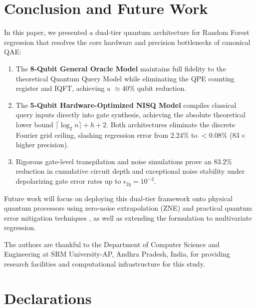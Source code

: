 \documentclass[sn-mathphys,Numbered]{sn-jnl}
\theoremstyle{thmstyleone}
\theoremstyle{thmstyletwo}
\theoremstyle{thmstylethree}
\begin{document}
\section{Conclusion and Future Work}\label{sec7}

In this paper, we presented a dual-tier quantum architecture for Random Forest regression that resolves the core hardware and precision bottlenecks of canonical QAE:
\begin{enumerate}
    \item The \textbf{8-Qubit General Oracle Model} maintains full fidelity to the theoretical Quantum Query Model while eliminating the QPE counting register and IQFT, achieving a $\approx 40\%$ qubit reduction.
    \item The \textbf{5-Qubit Hardware-Optimized NISQ Model} compiles classical query inputs directly into gate synthesis, achieving the absolute theoretical lower bound $\lceil\log_2 n\rceil + h + 2$. Both architectures eliminate the discrete Fourier grid ceiling, slashing regression error from $2.24\%$ to $< 0.08\%$ ($83\times$ higher precision).
    \item Rigorous gate-level transpilation and noise simulations prove an $83.2\%$ reduction in cumulative circuit depth and exceptional noise stability under depolarizing gate error rates up to $\epsilon_{2q} = 10^{-2}$.
\end{enumerate}
Future work will focus on deploying this dual-tier framework onto physical quantum processors using zero-noise extrapolation (ZNE) \cite{temme2017error} and practical quantum error mitigation techniques \cite{endo2018practical}, as well as extending the formulation to multivariate regression.

\backmatter

The authors are thankful to the Department of Computer Science and Engineering at SRM University-AP, Andhra Pradesh, India, for providing research facilities and computational infrastructure for this study.

\section*{Declarations}
\end{document}
